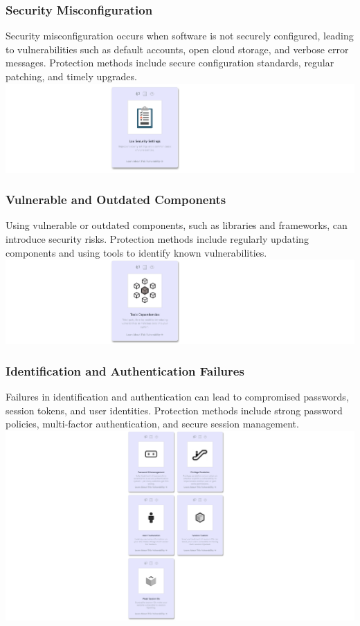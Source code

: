\documentclass[12pt]{article}
\begin{document}
\subsubsection{Security Misconfiguration}
Security misconfiguration occurs when software is not securely configured, leading to vulnerabilities such as default accounts, open cloud storage, and verbose error messages. Protection methods include secure configuration standards, regular patching, and timely upgrades. \\
\includegraphics[width=1\textwidth]{Image10.png}

\newpage

\subsubsection{Vulnerable and Outdated Components}
Using vulnerable or outdated components, such as libraries and frameworks, can introduce security risks. Protection methods include regularly updating components and using tools to identify known vulnerabilities. \\ 
\includegraphics[width=1\textwidth]{Image11.png}

\subsubsection{Identification and Authentication Failures}
Failures in identification and authentication can lead to compromised passwords, session tokens, and user identities. Protection methods include strong password policies, multi-factor authentication, and secure session management. \\
\includegraphics[width=1\textwidth]{Image12.png}
\end{document}
